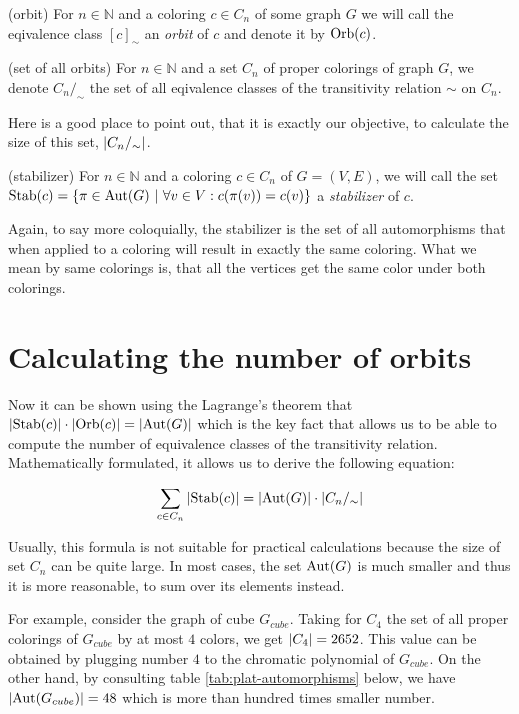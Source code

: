 \begin{defn}(orbit)
    For $n \in \mathbb{N}$ and a coloring $c \in C_n$ of some graph $G$ we will call the eqivalence class $[c]_{\sim}$ an \emph{orbit} of $c$ and denote it by $\operatorname{Orb}(c)$.
\end{defn}

\begin{defn}(set of all orbits)
    For $n \in \mathbb{N}$ and a set $C_n$ of proper colorings of graph $G$, we denote $C_n/_\sim$ the set of all eqivalence classes of the transitivity relation $\sim$ on $C_n$.
\end{defn}

Here is a good place to point out, that it is exactly our objective, to calculate the size of this set, $\left|{C_n/_\sim}\right|$.

\begin{defn}(stabilizer)
    For $n \in \mathbb{N}$ and a coloring $c \in C_n$ of $G=(V,E)$, we will call the set $\operatorname{Stab}(c) = \{ \pi \in \operatorname{Aut}(G) \ | \ \forall v \in V : c(\pi(v)) = c(v) \}$ a \emph{stabilizer} of $c$. 
\end{defn}

Again, to say more coloquially, the stabilizer is the set of all automorphisms that when applied to a coloring will result in exactly the same coloring. What we mean by same colorings is, that all the vertices get the same color under both colorings.

\section{Calculating the number of orbits}

Now it can be shown using the Lagrange's theorem that $\left|{\operatorname{Stab}(c)}\right| \cdot \left|{\operatorname{Orb}(c)}\right| = \left|{\operatorname{Aut}(G)}\right|$ which is the key fact that allows us to be able to compute the number of equivalence classes of the transitivity relation. Mathematically formulated, it allows us to derive the following equation:

\begin{equation}\label{eqn:orbits-by-stab}
    \sum_{c\in C_n}\left|{\operatorname{Stab}(c)}\right| = \left|{\operatorname{Aut}(G)}\right| \cdot \left|{C_n/_\sim}\right| 
\end{equation}


Usually, this formula is not suitable for practical calculations because the size of set $C_n$ can be quite large. In most cases, the set $\operatorname{Aut}(G)$ is much smaller and thus it is more reasonable, to sum over its elements instead. 

For example, consider the graph of cube $G_{cube}$. Taking for $C_4$ the set of all proper colorings of $G_{cube}$ by at most $4$ colors, we get $\left|{C_4}\right| = 2652$. This value can be obtained by plugging number $4$ to the chromatic polynomial of $G_{cube}$. On the other hand, by consulting table \ref{tab:plat-automorphisms} below, we have $\left|{\operatorname{Aut}(G_{cube})}\right| = 48$ which is more than hundred times smaller number.

